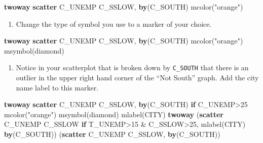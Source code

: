\documentclass[
]{book}
\newenvironment{Shaded}{\begin{snugshade}}{\end{snugshade}}
\newcommand{\BaseNTok}[1]{\textcolor[rgb]{0.00,0.00,0.81}{#1}}
\newcommand{\KeywordTok}[1]{\textcolor[rgb]{0.13,0.29,0.53}{\textbf{#1}}}
\newcommand{\NormalTok}[1]{#1}
\newcommand{\StringTok}[1]{\textcolor[rgb]{0.31,0.60,0.02}{#1}}
\providecommand{\tightlist}{%
  \setlength{\itemsep}{0pt}\setlength{\parskip}{0pt}}
\begin{document}
\begin{alert}
\begin{Shaded}
\begin{Highlighting}[]
\KeywordTok{twoway} \KeywordTok{scatter}\NormalTok{ C\_UNEMP C\_SSLOW, }\KeywordTok{by}\NormalTok{(C\_SOUTH) mcolor(}\StringTok{"orange"}\NormalTok{)}
\end{Highlighting}
\end{Shaded}

\begin{enumerate}
\def\labelenumi{\arabic{enumi}.}
\setcounter{enumi}{4}
\tightlist
\item
  Change the type of symbol you use to a marker of your choice.
\end{enumerate}

\begin{Shaded}
\begin{Highlighting}[]
\KeywordTok{twoway} \KeywordTok{scatter}\NormalTok{ C\_UNEMP C\_SSLOW, }\KeywordTok{by}\NormalTok{(C\_SOUTH) mcolor(}\StringTok{"orange"}\NormalTok{) }\BaseNTok{msymbol}\NormalTok{(diamond)}
\end{Highlighting}
\end{Shaded}

\begin{enumerate}
\def\labelenumi{\arabic{enumi}.}
\setcounter{enumi}{5}
\tightlist
\item
  Notice in your scatterplot that is broken down by \texttt{C\_SOUTH} that there is an outlier in the upper right hand corner of the ``Not South'' graph. Add the city name label to this marker.
\end{enumerate}

\begin{Shaded}
\begin{Highlighting}[]
\KeywordTok{twoway} \KeywordTok{scatter}\NormalTok{ C\_UNEMP C\_SSLOW, }\KeywordTok{by}\NormalTok{(C\_SOUTH) }\KeywordTok{if}\NormalTok{ C\_UNEMP\textgreater{}25 mcolor(}\StringTok{"orange"}\NormalTok{) }\BaseNTok{msymbol}\NormalTok{(diamond) }\BaseNTok{mlabel}\NormalTok{(CITY)}
\KeywordTok{twoway}\NormalTok{ (}\KeywordTok{scatter}\NormalTok{ C\_UNEMP C\_SSLOW }\KeywordTok{if}\NormalTok{ T\_UNEMP\textgreater{}15 \& C\_SSLOW\textgreater{}25, }\BaseNTok{mlabel}\NormalTok{(CITY) }\KeywordTok{by}\NormalTok{(C\_SOUTH)) (}\KeywordTok{scatter}\NormalTok{ C\_UNEMP C\_SSLOW, }\KeywordTok{by}\NormalTok{(C\_SOUTH))}
\end{Highlighting}
\end{Shaded}

\end{alert}
\end{document}
